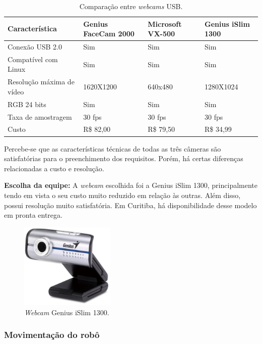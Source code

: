 \begin{table}[h]
  \caption{Comparação entre \textit{webcams} USB.}
  \centering
  \begin{tabular}{p{5cm}|p{3.3cm}p{3cm}p{2.5cm}}
    \toprule
    \textbf{Característica} & \textbf{Genius FaceCam 2000} & \multicolumn{1}{l}{\textbf{Microsoft VX-500}} & \textbf{Genius iSlim 1300}  \\
    \hline
     Conexão USB 2.0 & Sim & Sim & Sim  \\
     \hline
     Compatível com Linux & Sim & Sim & Sim \\
     \hline
     Resolução máxima de vídeo & 1620X1200 & 640x480 & 1280X1024 \\
     \hline
     RGB 24 bits & Sim & Sim & Sim \\
     \hline 
     Taxa de amostragem & 30 fps & 30 fps & 30 fps \\
     \hline
     Custo & R\$ 82,00 & R\$ 79,50 & R\$ 34,99 \\
    \bottomrule
  \end{tabular}
  \label{tab:alternativas_camera}
\end{table}

Percebe-se que as características técnicas de todas as três câmeras são satisfatórias para o preenchimento dos requisitos. Porém, há certas diferenças relacionadas a custo e resolução.

\textbf{Escolha da equipe:} A \textit{webcam} escolhida foi a Genius iSlim 1300, principalmente tendo em vista o seu custo muito reduzido em relação às outras. Além disso, possui resolução muito satisfatória. Em Curitiba, há disponibilidade desse modelo em pronta entrega.

\begin{figure}[H]
\centering
\includegraphics[width=0.4\textwidth]{./figuras/quali/genius-slim1300.jpg}
\caption{\textit{Webcam} Genius iSlim 1300.}
\label{fig:genius-islim-1300}
\end{figure}

\subsubsection{Movimentação do robô}

